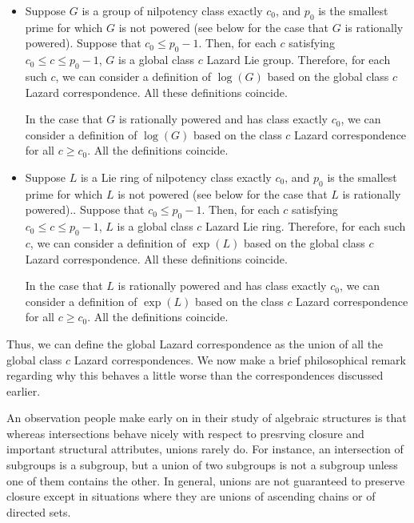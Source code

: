 \documentclass{ucetd}
\begin{document}
\begin{itemize}
\item Suppose $G$ is a group of nilpotency class exactly $c_0$, and
  $p_0$ is the smallest prime for which $G$ is not powered (see below
  for the case that $G$ is rationally powered). Suppose that $c_0 \le
  p_0 - 1$. Then, for each $c$ satisfying $c_0 \le c \le p_0 - 1$, $G$
  is a global class $c$ Lazard Lie group. Therefore, for each such
  $c$, we can consider a definition of $\log(G)$ based on the global
  class $c$ Lazard correspondence. All these definitions coincide.

  In the case that $G$ is rationally powered and has class exactly
  $c_0$, we can consider a definition of $\log(G)$ based on the class
  $c$ Lazard correspondence for all $c \ge c_0$. All the definitions
  coincide.
\item Suppose $L$ is a Lie ring of nilpotency class exactly $c_0$, and
  $p_0$ is the smallest prime for which $L$ is not powered (see below
  for the case that $L$ is rationally powered).. Suppose that $c_0 \le
  p_0 - 1$. Then, for each $c$ satisfying $c_0 \le c \le p_0 - 1$, $L$
  is a global class $c$ Lazard Lie ring. Therefore, for each such $c$,
  we can consider a definition of $\exp(L)$ based on the global class
  $c$ Lazard correspondence. All these definitions coincide.

  In the case that $L$ is rationally powered and has class exactly
  $c_0$, we can consider a definition of $\exp(L)$ based on the class
  $c$ Lazard correspondence for all $c \ge c_0$. All the definitions
  coincide.
\end{itemize}

Thus, we can define the global Lazard correspondence as the union of
all the global class $c$ Lazard correspondences. We now make a brief
philosophical remark regarding why this behaves a little worse than
the correspondences discussed earlier.

An observation people make early on in their study of algebraic
structures is that whereas intersections behave nicely with respect to
presrving closure and important structural attributes, unions rarely
do. For instance, an intersection of subgroups is a subgroup, but a
union of two subgroups is not a subgroup unless one of them contains
the other. In general, unions are not guaranteed to preserve closure
except in situations where they are unions of ascending chains or of
directed sets.
\end{document}
